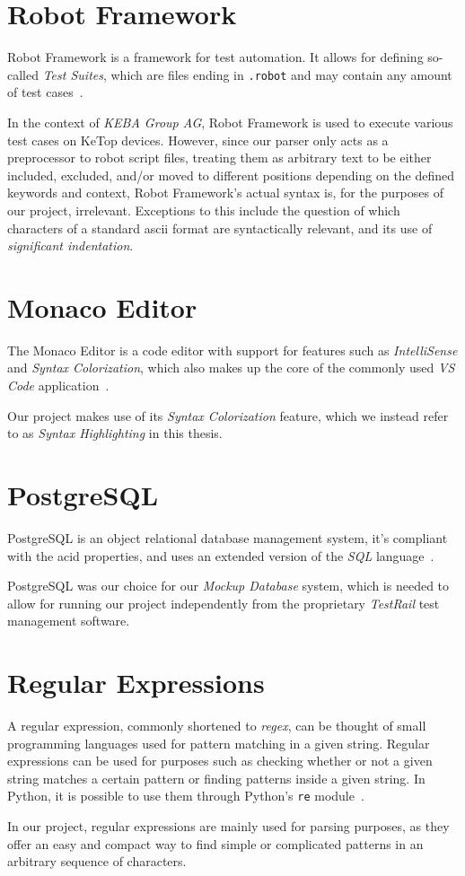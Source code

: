 \section{Robot Framework}

Robot Framework is a framework for test automation. It allows for defining so-called \textit{Test Suites}, which are files ending in \verb|.robot| and may contain any amount of test cases~\cite{robot-framework}.

In the context of \textit{KEBA Group AG}, Robot Framework is used to execute various test cases on KeTop devices. However, since our parser only acts as a preprocessor to robot script files, treating them as arbitrary text to be either included, excluded, and/or moved to different positions depending on the defined keywords and context, Robot Framework's actual syntax is, for the purposes of our project, irrelevant. Exceptions to this include the question of which characters of a standard \gls{ascii} format are syntactically relevant, and its use of \textit{significant indentation}. 

\section{Monaco Editor}

The Monaco Editor is a code editor with support for features such as \textit{IntelliSense} and \textit{Syntax Colorization}, which also makes up the core of the commonly used \textit{VS Code} application~\cite{monaco-editor}.

Our project makes use of its \textit{Syntax Colorization} feature, which we instead refer to as \textit{Syntax Highlighting} in this thesis. 

\section{PostgreSQL}

PostgreSQL is an object relational database management system, it's compliant with the \gls{acid} properties, and uses an extended version of the \textit{SQL} language~\cite{postgresql}.

PostgreSQL was our choice for our \textit{Mockup Database} system, which is needed to allow for running our project independently from the proprietary \textit{TestRail} test management software.

\section{Regular Expressions}

A regular expression, commonly shortened to \textit{regex}, can be thought of small programming languages used for pattern matching in a given string. Regular expressions can be used for purposes such as checking whether or not a given string matches a certain pattern or finding patterns inside a given string. In Python, it is possible to use them through Python's \verb|re| module~\cite{py-re}.

In our project, regular expressions are mainly used for parsing purposes, as they offer an easy and compact way to find simple or complicated patterns in an arbitrary sequence of characters.
